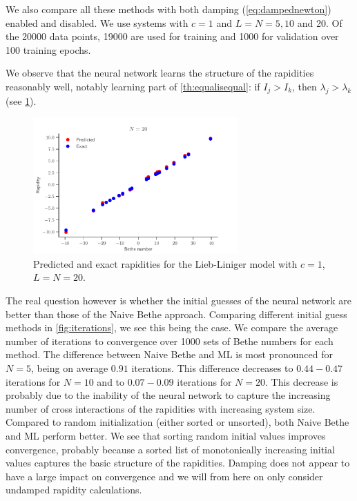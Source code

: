 \documentclass[11pt, a4paper]{report} %
\begin{document}
We also compare all these methods with both damping (\cref{eq:dampednewton}) enabled and disabled. We use systems with \(c=1\) and \(L=N=5,10\) and 20.
Of the 20000 data points, 19000 are used for training and 1000 for validation over 100 training epochs.

We observe that the neural network learns the structure of the rapidities reasonably well, notably learning part of \cref{th:equalisequal}: if \(I_j >I_k\), then \(\lambda_j > \lambda_k\) (see \cref{fig:rapidities}).

\begin{figure}[tb]
  \centering
  \includegraphics[width=0.70\textwidth]{rapidities_20.pdf}
  \caption{Predicted and exact rapidities for the Lieb-Liniger model with \(c=1\), \(L=N=20\).}
  \label{fig:rapidities}
\end{figure}

The real question however is whether the initial guesses of the neural network are better than those of the Naive Bethe approach.
Comparing different initial guess methods in \cref{fig:iterations}, we see this being the case.
We compare the average number of iterations to convergence over 1000 sets of Bethe numbers for each method.
The difference between Naive Bethe and ML is most pronounced for \(N=5\), being on average \(0.91\) iterations.
This difference decreases to \(0.44-0.47\) iterations for \(N=10\) and to \(0.07-0.09\) iterations for \(N=20\).
This decrease is probably due to the inability of the neural network to capture the increasing number of cross interactions of the rapidities with increasing system size.
Compared to random initialization (either sorted or unsorted), both Naive Bethe and ML perform better.
We see that sorting random initial values improves convergence, probably because a sorted list of monotonically increasing initial values captures the basic structure of the rapidities.
Damping does not appear to have a large impact on convergence and we will from here on only consider undamped rapidity calculations.
\end{document}
